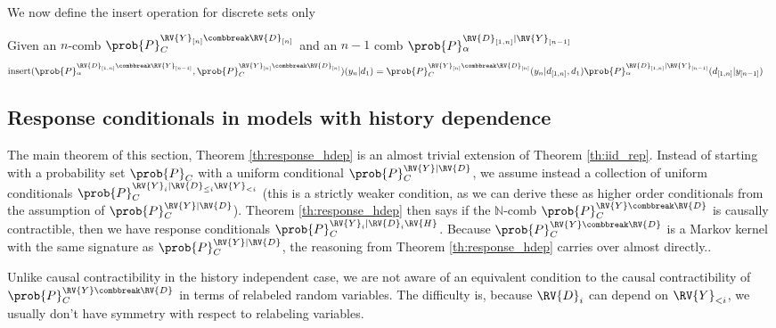 We now define the insert operation for discrete sets only

\begin{definition}
Given an $n$-comb $\prob{P}_C^{\RV{Y}_{[n]}\combbreak \RV{D}_{[n]}}$ and an $n-1$ comb $\prob{P}_\alpha^{\RV{D}_{[1,n]}|\RV{Y}_{[n-1]}}$
\begin{align}
    \mathrm{insert}(\prob{P}_\alpha^{\RV{D}_{[1,n]}\combbreak \RV{Y}_{[n-1]}},\prob{P}_C^{\RV{Y}_{[n]}\combbreak \RV{D}_{[n]}})(y_n|d_1) &= \prob{P}_C^{\RV{Y}_{[n]}\combbreak \RV{D}_{[n]}}(y_n|d_{[1,n]},d_1)\prob{P}_\alpha^{\RV{D}_{[1,n]}|\RV{Y}_{[n-1]}}(d_{[1,n]}|y_{[n-1]})
\end{align}
\end{definition}

\subsection{Response conditionals in models with history dependence}

The main theorem of this section, Theorem \ref{th:response_hdep} is an almost trivial extension of Theorem \ref{th:iid_rep}. Instead of starting with a probability set $\prob{P}_C$ with a uniform conditional $\prob{P}_C^{\RV{Y}|\RV{D}}$, we assume instead a collection of uniform conditionals $\prob{P}_C^{\RV{Y}_i|\RV{D}_{\leq i}\RV{Y}_{<i}}$ (this is a strictly weaker condition, as we can derive these as higher order conditionals from the assumption of $\prob{P}_C^{\RV{Y}|\RV{D}}$). Theorem \ref{th:response_hdep} then says if the $\mathbb{N}$-comb $\prob{P}_C^{\RV{Y}\combbreak\RV{D}}$ is causally contractible, then we have response conditionals $\prob{P}_C^{\RV{Y}_i|\RV{D}_i\RV{H}}$. Because $\prob{P}_C^{\RV{Y}\combbreak\RV{D}}$ is a Markov kernel with the same signature as $\prob{P}_C^{\RV{Y}|\RV{D}}$, the reasoning from Theorem \ref{th:response_hdep} carries over almost directly..

Unlike causal contractibility in the history independent case, we are not aware of an equivalent condition to the causal contractibility of $\prob{P}_C^{\RV{Y}\combbreak\RV{D}}$ in terms of relabeled random variables. The difficulty is, because $\RV{D}_i$ can depend on $\RV{Y}_{<i}$, we usually don't have symmetry with respect to relabeling variables.

